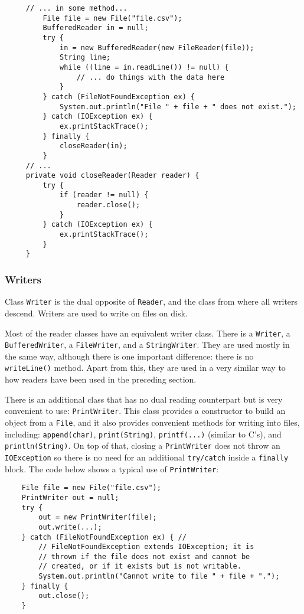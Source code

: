 \label{code:basic-example-with-finally-and-aux-method}
\begin{verbatim}
     // ... in some method...
         File file = new File("file.csv");
         BufferedReader in = null;
         try {
             in = new BufferedReader(new FileReader(file)); 
             String line;
             while ((line = in.readLine()) != null) {
                 // ... do things with the data here
             }
         } catch (FileNotFoundException ex) {
             System.out.println("File " + file + " does not exist.");
         } catch (IOException ex) {
             ex.printStackTrace();
         } finally { 
             closeReader(in);
         }
     // ...
     private void closeReader(Reader reader) { 
         try {
             if (reader != null) {
                 reader.close();
             }
         } catch (IOException ex) {
             ex.printStackTrace();
         }
     }        
\end{verbatim}

\subsubsection{Writers}
\label{sec:writers}

Class \verb+Writer+ is the dual opposite of \verb+Reader+, and the
class from where all writers descend. Writers are used to write on
files on disk. 

Most of the reader classes have an equivalent writer class. There is a
\verb+Writer+, a \verb+BufferedWriter+, a \verb+FileWriter+, and a
\verb+StringWriter+. They are used mostly in the same way, although
there is one important difference: there is no \verb+writeLine()+
method. Apart from this, they are used in a very similar way to how
readers have been used in the preceding section. 

There is an additional class that has no dual reading counterpart but
is very convenient to use: \verb+PrintWriter+. This class provides a
constructor to build an object from a \verb+File+, and it also provides 
convenient methods for writing into files, including: 
\verb+append(char)+, 
\verb+print(String)+, 
\verb+printf(...)+ (similar to C's), 
and 
\verb+println(String)+. On top of that, closing a \verb+PrintWriter+
does not throw an \verb+IOException+ so there is no need for an
additional \verb+try/catch+ inside a \verb+finally+ block. 
The code below shows a typical use of \verb+PrintWriter+: 

\begin{verbatim}
    File file = new File("file.csv");
    PrintWriter out = null;
    try {
        out = new PrintWriter(file); 
        out.write(...);
    } catch (FileNotFoundException ex) { // 
        // FileNotFoundException extends IOException; it is 
        // thrown if the file does not exist and cannot be 
        // created, or if it exists but is not writable.
        System.out.println("Cannot write to file " + file + ".");
    } finally { 
        out.close();
    }    
\end{verbatim}

